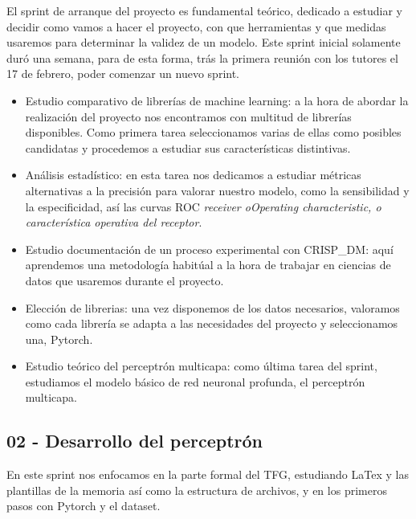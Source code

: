 El sprint de arranque del proyecto es fundamental teórico, dedicado a estudiar y decidir como vamos a hacer el proyecto, con que herramientas y que medidas usaremos para determinar la validez de un modelo. Este sprint inicial solamente duró una semana, para de esta forma, trás la primera reunión con los tutores el 17 de febrero, poder comenzar un nuevo sprint.

\begin{itemize}
    \item Estudio comparativo de librerías de machine learning: a la hora de abordar la realización del proyecto nos encontramos con multitud de librerías disponibles. Como primera tarea seleccionamos varias de ellas como posibles candidatas y procedemos a estudiar sus características distintivas.    
    \item Análisis estadístico: en esta tarea nos dedicamos a estudiar métricas alternativas a la precisión para valorar nuestro modelo, como la sensibilidad y la especificidad, así las curvas ROC \textit{receiver oOperating characteristic, o característica operativa del receptor}.
    \item Estudio documentación de un proceso experimental con CRISP\_DM: aquí aprendemos una metodología habitúal a la hora de trabajar en ciencias de datos que usaremos durante el proyecto.
    \item Elección de librerias: una vez disponemos de los datos necesarios, valoramos como cada librería se adapta a las necesidades del proyecto y seleccionamos una, Pytorch.
    \item Estudio teórico del perceptrón multicapa: como última tarea del sprint, estudiamos el modelo básico de red neuronal profunda, el perceptrón multicapa.
\end{itemize}


\subsection{02 - Desarrollo del perceptrón \newline
[02/03/2020 – 16/03/2020]}

En este sprint nos enfocamos en la parte formal del TFG, estudiando LaTex y las plantillas de la memoria así como la estructura de archivos, y en los primeros pasos con Pytorch y el dataset.

